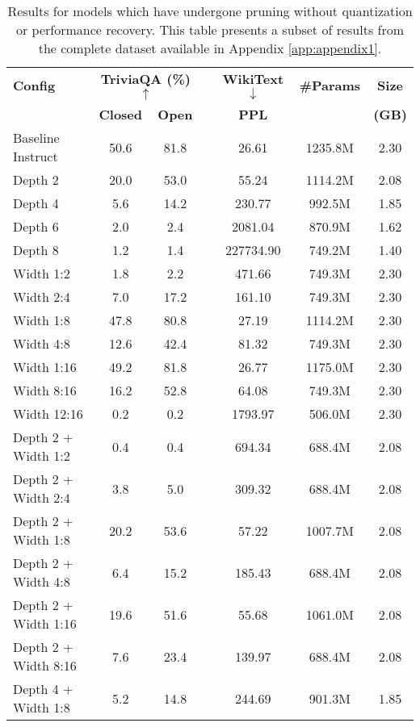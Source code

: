 {\begin{table}[htbp]
\centering
\footnotesize
\caption[Results for Pruning-Only Configurations (Subset)]{Results for models which have undergone pruning without quantization or performance recovery. This table presents a subset of results from the complete dataset available in Appendix \ref{app:appendix1}.} \label{tab:pruning_only_results}
\label{tab:depth_pruning_results}
\begin{tabular}{lcccccc}
\hline
\textbf{Config} & \multicolumn{2}{c}{\textbf{TriviaQA (\%) $\uparrow$}} & & \textbf{WikiText $\downarrow$} & \textbf{\#Params} & \textbf{Size} \\
\cline{2-3}
& \textbf{Closed} & \textbf{Open} & & \textbf{PPL} & & \textbf{(GB)} \\
\hline
Baseline Instruct & 50.6 & 81.8 & & 26.61 & 1235.8M & 2.30 \\
Depth 2 & 20.0 & 53.0 & & 55.24 & 1114.2M & 2.08 \\
Depth 4 & 5.6 & 14.2 & & 230.77 & 992.5M & 1.85 \\
Depth 6 & 2.0 & 2.4 & & 2081.04 & 870.9M & 1.62 \\
Depth 8 & 1.2 & 1.4 & & 227734.90 & 749.2M & 1.40 \\
Width 1:2 & 1.8 & 2.2 & & 471.66 & 749.3M & 2.30 \\
Width 2:4 & 7.0 & 17.2 & & 161.10 & 749.3M & 2.30 \\
Width 1:8 & 47.8 & 80.8 & & 27.19 & 1114.2M & 2.30 \\
Width 4:8 & 12.6 & 42.4 & & 81.32 & 749.3M & 2.30 \\
Width 1:16 & 49.2 & 81.8 & & 26.77 & 1175.0M & 2.30 \\
Width 8:16 & 16.2 & 52.8 & & 64.08 & 749.3M & 2.30 \\
Width 12:16 & 0.2 & 0.2 & & 1793.97 & 506.0M & 2.30 \\
Depth 2 + Width 1:2 & 0.4 & 0.4 & & 694.34 & 688.4M & 2.08 \\
Depth 2 + Width 2:4 & 3.8 & 5.0 & & 309.32 & 688.4M & 2.08 \\
Depth 2 + Width 1:8 & 20.2 & 53.6 & & 57.22 & 1007.7M & 2.08 \\
Depth 2 + Width 4:8 & 6.4 & 15.2 & & 185.43 & 688.4M & 2.08 \\
Depth 2 + Width 1:16 & 19.6 & 51.6 & & 55.68 & 1061.0M & 2.08 \\
Depth 2 + Width 8:16 & 7.6 & 23.4 & & 139.97 & 688.4M & 2.08 \\
Depth 4 + Width 1:8 & 5.2 & 14.8 & & 244.69 & 901.3M & 1.85 \\

\end{tabular}
\end{table}}
